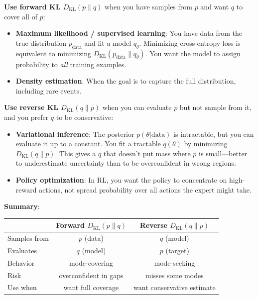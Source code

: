 \begin{remark}
    \textbf{Use forward KL $D_{\mathrm{KL}}(p \| q)$} when you have samples from $p$ and want $q$ to cover all of $p$:
    \begin{itemize}
        \item \textbf{Maximum likelihood / supervised learning}: You have data from the true distribution $p_{\text{data}}$ and fit a model $q_\theta$. Minimizing cross-entropy loss is equivalent to minimizing $D_{\mathrm{KL}}(p_{\text{data}} \| q_\theta)$. You want the model to assign probability to \emph{all} training examples.
        \item \textbf{Density estimation}: When the goal is to capture the full distribution, including rare events.
    \end{itemize}

    \textbf{Use reverse KL $D_{\mathrm{KL}}(q \| p)$} when you can evaluate $p$ but not sample from it, and you prefer $q$ to be conservative:
    \begin{itemize}
        \item \textbf{Variational inference}: The posterior $p(\theta | \text{data})$ is intractable, but you can evaluate it up to a constant. You fit a tractable $q(\theta)$ by minimizing $D_{\mathrm{KL}}(q \| p)$. This gives a $q$ that doesn't put mass where $p$ is small---better to underestimate uncertainty than to be overconfident in wrong regions.
        \item \textbf{Policy optimization}: In RL, you want the policy to concentrate on high-reward actions, not spread probability over all actions the expert might take.
    \end{itemize}

    \textbf{Summary}:
    \begin{center}
        \begin{tabular}{l|cc}
                         & Forward $D_{\mathrm{KL}}(p \| q)$ & Reverse $D_{\mathrm{KL}}(q \| p)$ \\
            \hline
            Samples from & $p$ (data)                        & $q$ (model)                       \\
            Evaluates    & $q$ (model)                       & $p$ (target)                      \\
            Behavior     & mode-covering                     & mode-seeking                      \\
            Risk         & overconfident in gaps             & misses some modes                 \\
            Use when     & want full coverage                & want conservative estimate
        \end{tabular}
    \end{center}
\end{remark}
